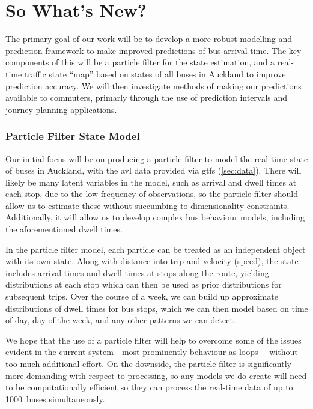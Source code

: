 \documentclass[12pt,a4paper]{article}
\newcommand{\pf}{particle filter}
\begin{document}
\section{So What's New?}
\label{sec:whatsnew}

The primary goal of our work will be to develop a more robust modelling
and prediction framework to make improved predictions of bus arrival time.
The key components of this will be a particle filter for the state estimation,
and a real-time traffic state ``map'' based on states of all buses in Auckland
to improve prediction accuracy.
We will then investigate methods of making our predictions available to commuters,
primarly through the use of prediction intervals and journey planning applications.


\subsubsection*{Particle Filter State Model}

Our initial focus will be on producing a particle filter to model the real-time state
of buses in Auckland,
with the \gls{avl} data provided via \gls{gtfs} (\cref{sec:data}).
There will likely be many latent variables in the model,
such as arrival and dwell times at each stop,
due to the low frequency of observations,
so the particle filter should allow us to estimate these without
succumbing to dimensionality constraints.
Additionally, it will allow us to develop complex bus behaviour models,
including the aforementioned dwell times.


In the particle filter model,
each particle can be treated as an independent object with its own state.
Along with distance into trip and velocity (speed),
the state includes arrival times and dwell times at stops along the route,
yielding distributions at each stop which can then be used
as prior distributions for subsequent trips.
Over the course of a week, 
we can build up approximate distributions of dwell times for bus stops,
which we can then model based on time of day, day of the week,
and any other patterns we can detect.


We hope that the use of a \pf{} will help to overcome some of the issues
evident in the current system---most prominently behaviour as loops---%
without too much additional effort.
On the downside, the \pf{} is significantly more demanding with respect to processing, 
so any models we do create will need to be computationally efficient
so they can process the real-time data of up to 1000~buses simultaneously.
\end{document}
